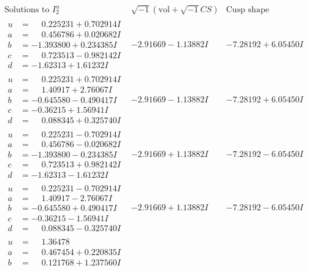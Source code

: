 \documentclass[1p]{elsarticle_modified}
\theoremstyle{definition}
\newcommand{\I}{\sqrt{-1}}
\begin{document}
$$\begin{array}{c|c|c}  
\text{Solutions to }I^u_{2}& \I (\text{vol} + \sqrt{-1}CS) & \text{Cusp shape}\\
 \hline 
\begin{aligned}
u &= \phantom{-}0.225231 + 0.702914 I \\
a &= \phantom{-}0.456786 + 0.020682 I \\
b &= -1.393800 + 0.234385 I \\
c &= \phantom{-}0.723513 - 0.982142 I \\
d &= -1.62313 + 1.61232 I\end{aligned}
 & -2.91669 - 1.13882 I & -7.28192 + 6.05450 I \\ \hline\begin{aligned}
u &= \phantom{-}0.225231 + 0.702914 I \\
a &= \phantom{-}1.40917 + 2.76067 I \\
b &= -0.645580 - 0.490417 I \\
c &= -0.36215 + 1.56941 I \\
d &= \phantom{-}0.088345 + 0.325740 I\end{aligned}
 & -2.91669 - 1.13882 I & -7.28192 + 6.05450 I \\ \hline\begin{aligned}
u &= \phantom{-}0.225231 - 0.702914 I \\
a &= \phantom{-}0.456786 - 0.020682 I \\
b &= -1.393800 - 0.234385 I \\
c &= \phantom{-}0.723513 + 0.982142 I \\
d &= -1.62313 - 1.61232 I\end{aligned}
 & -2.91669 + 1.13882 I & -7.28192 - 6.05450 I \\ \hline\begin{aligned}
u &= \phantom{-}0.225231 - 0.702914 I \\
a &= \phantom{-}1.40917 - 2.76067 I \\
b &= -0.645580 + 0.490417 I \\
c &= -0.36215 - 1.56941 I \\
d &= \phantom{-}0.088345 - 0.325740 I\end{aligned}
 & -2.91669 + 1.13882 I & -7.28192 - 6.05450 I \\ \hline\begin{aligned}
u &= \phantom{-}1.36478\phantom{ +0.000000I} \\
a &= \phantom{-}0.467454 + 0.220835 I \\
b &= \phantom{-}0.121768 + 1.237560 I \\

\end{aligned}
\end{array}$$
\end{document}
